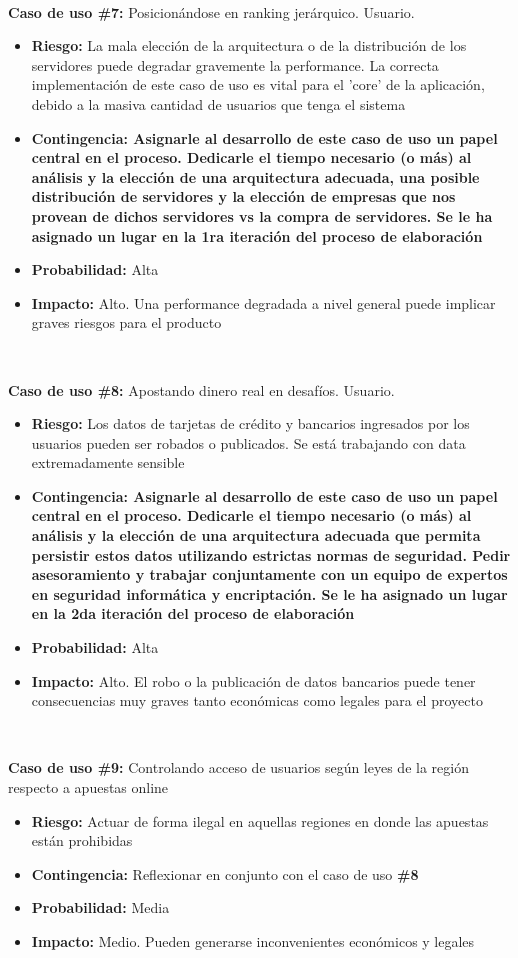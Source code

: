 ~

\textbf{Caso de uso \#7:} Posicionándose en ranking jerárquico. Usuario.
\begin{itemize}
\item{\textbf{Riesgo:} La mala elección de la arquitectura o de la distribución de los servidores puede degradar gravemente la performance. La correcta implementación de este caso de uso es vital para el 'core' de la aplicación, debido a la masiva cantidad de usuarios que tenga el sistema}
\item{\textbf{Contingencia: Asignarle al desarrollo de este caso de uso un papel central en el proceso. Dedicarle el tiempo necesario (o más) al análisis y la elección 
de una arquitectura adecuada, una posible distribución de servidores y la elección de empresas que nos provean de dichos servidores vs la compra de servidores. Se le ha asignado
un lugar en la 1ra iteración del proceso de elaboración}} 
\item{\textbf{Probabilidad:} Alta}
\item{\textbf{Impacto:} Alto. Una performance degradada a nivel general puede implicar graves riesgos para el producto}
\end{itemize}

~

\textbf{Caso de uso \#8:} Apostando dinero real en desafíos. Usuario.
\begin{itemize}
\item{\textbf{Riesgo:} Los datos de tarjetas de crédito y bancarios ingresados por los usuarios pueden ser robados o publicados. Se está trabajando con data extremadamente
sensible}
\item{\textbf{Contingencia: Asignarle al desarrollo de este caso de uso un papel central en el proceso. Dedicarle el tiempo necesario (o más) al análisis y la elección 
de una arquitectura adecuada que permita persistir estos datos utilizando estrictas normas de seguridad. Pedir asesoramiento y trabajar conjuntamente con un equipo de expertos en seguridad informática y encriptación. Se le ha asignado un lugar en la 2da iteración del proceso de elaboración}} 
\item{\textbf{Probabilidad:} Alta}
\item{\textbf{Impacto:} Alto. El robo o la publicación de datos bancarios puede tener consecuencias muy graves tanto económicas como legales para el proyecto}
\end{itemize}

~

\textbf{Caso de uso \#9:} Controlando acceso de usuarios según leyes de la región respecto a apuestas online
\begin{itemize}
\item{\textbf{Riesgo:} Actuar de forma ilegal en aquellas regiones en donde las apuestas están prohibidas}
\item{\textbf{Contingencia:} Reflexionar en conjunto con el caso de uso \textbf{\#8}} 
\item{\textbf{Probabilidad:} Media}
\item{\textbf{Impacto:} Medio. Pueden generarse inconvenientes económicos y legales}
\end{itemize}


